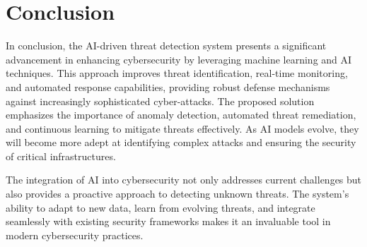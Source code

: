 \documentclass[oneside,a4paper,12pt]{report}
\begin{document}
\section*{Conclusion}
In conclusion, the AI-driven threat detection system presents a significant advancement in enhancing cybersecurity by leveraging machine learning and AI techniques. This approach improves threat identification, real-time monitoring, and automated response capabilities, providing robust defense mechanisms against increasingly sophisticated cyber-attacks. The proposed solution emphasizes the importance of anomaly detection, automated threat remediation, and continuous learning to mitigate threats effectively. As AI models evolve, they will become more adept at identifying complex attacks and ensuring the security of critical infrastructures.

The integration of AI into cybersecurity not only addresses current challenges but also provides a proactive approach to detecting unknown threats. The system’s ability to adapt to new data, learn from evolving threats, and integrate seamlessly with existing security frameworks makes it an invaluable tool in modern cybersecurity practices.
\end{document}
